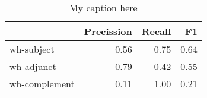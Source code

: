 \begin{table}[!ht]
\centering
\begin{tabular}{lrrr}
\toprule
{} &  Precission &  Recall &   F1 \\
\midrule
wh-subject    &        0.56 &    0.75 & 0.64 \\
wh-adjunct    &        0.79 &    0.42 & 0.55 \\
wh-complement &        0.11 &    1.00 & 0.21 \\
\bottomrule
\end{tabular}
\caption{My caption here}
\label{tab:WH-ocd-combined-F1}
\end{table}
